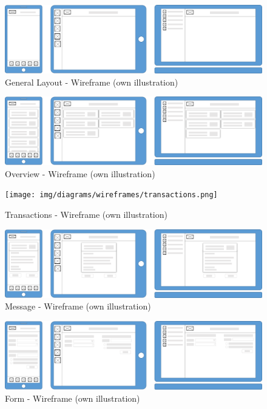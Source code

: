 \begin{figure}
    \centering
    \includegraphics[width=\textwidth]{img/diagrams/wireframes/general.png}
    \caption[General Layout - Wireframe]{General Layout - Wireframe (own illustration)}
    \label{fig:}
\end{figure}

\begin{figure}
    \centering
    \includegraphics[width=\textwidth]{img/diagrams/wireframes/overview.png}
    \caption[General Layout - Wireframe]{Overview - Wireframe (own illustration)}
    \label{fig:}
\end{figure}

\begin{figure}
    \centering
    \texttt{[image: img/diagrams/wireframes/transactions.png]}
    \caption[General Layout - Wireframe]{Transactions - Wireframe (own illustration)}
    \label{fig:}
\end{figure}

\begin{figure}
    \centering
    \includegraphics[width=\textwidth]{img/diagrams/wireframes/message.png}
    \caption[General Layout - Wireframe]{Message - Wireframe (own illustration)}
    \label{fig:}
\end{figure}

\begin{figure}
    \centering
    \includegraphics[width=\textwidth]{img/diagrams/wireframes/formular.png}
    \caption[General Layout - Wireframe]{Form - Wireframe (own illustration)}
    \label{fig:}
\end{figure}

